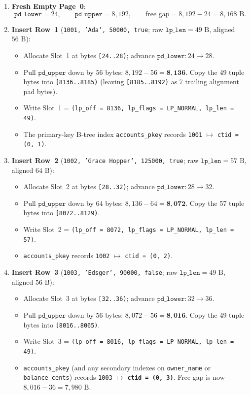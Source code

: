 \begin{enumerate}
  \item \textbf{Fresh Empty Page~0}:
  \[
    \texttt{pd\_lower} = 24, \qquad \texttt{pd\_upper} = 8{,}192, \qquad \text{free gap} = 8{,}192 - 24 = 8{,}168\text{ B}.
  \]

  \item \textbf{Insert Row~1} (\texttt{1001, 'Ada', 50000, true}; raw $\texttt{lp\_len} = 49\text{ B}$, aligned $56\text{ B}$):
  \begin{itemize}
    \item Allocate Slot~1 at bytes \texttt{[24..28)}; advance $\texttt{pd\_lower}: 24 \to 28$.
    \item Pull $\texttt{pd\_upper}$ down by $56$ bytes: $8{,}192 - 56 = \mathbf{8{,}136}$. Copy the 49 tuple bytes into \texttt{[8136..8185)} (leaving \texttt{[8185..8192)} as 7 trailing alignment pad bytes).
    \item Write Slot~1 = \texttt{(lp\_off = 8136, lp\_flags = LP\_NORMAL, lp\_len = 49)}.
    \item The primary-key B-tree index \texttt{accounts\_pkey} records \texttt{1001} $\mapsto$ \texttt{ctid = (0, 1)}.
  \end{itemize}

  \item \textbf{Insert Row~2} (\texttt{1002, 'Grace Hopper', 125000, true}; raw $\texttt{lp\_len} = 57\text{ B}$, aligned $64\text{ B}$):
  \begin{itemize}
    \item Allocate Slot~2 at bytes \texttt{[28..32)}; advance $\texttt{pd\_lower}: 28 \to 32$.
    \item Pull $\texttt{pd\_upper}$ down by $64$ bytes: $8{,}136 - 64 = \mathbf{8{,}072}$. Copy the 57 tuple bytes into \texttt{[8072..8129)}.
    \item Write Slot~2 = \texttt{(lp\_off = 8072, lp\_flags = LP\_NORMAL, lp\_len = 57)}.
    \item \texttt{accounts\_pkey} records \texttt{1002} $\mapsto$ \texttt{ctid = (0, 2)}.
  \end{itemize}

  \item \textbf{Insert Row~3} (\texttt{1003, 'Edsger', 90000, false}; raw $\texttt{lp\_len} = 49\text{ B}$, aligned $56\text{ B}$):
  \begin{itemize}
    \item Allocate Slot~3 at bytes \texttt{[32..36)}; advance $\texttt{pd\_lower}: 32 \to 36$.
    \item Pull $\texttt{pd\_upper}$ down by $56$ bytes: $8{,}072 - 56 = \mathbf{8{,}016}$. Copy the 49 tuple bytes into \texttt{[8016..8065)}.
    \item Write Slot~3 = \texttt{(lp\_off = 8016, lp\_flags = LP\_NORMAL, lp\_len = 49)}.
    \item \texttt{accounts\_pkey} (and any secondary indexes on \texttt{owner\_name} or \texttt{balance\_cents}) records \texttt{1003} $\mapsto$ \textbf{\texttt{ctid = (0, 3)}}. Free gap is now $8{,}016 - 36 = 7{,}980\text{ B}$.
  \end{itemize}


\end{enumerate}
